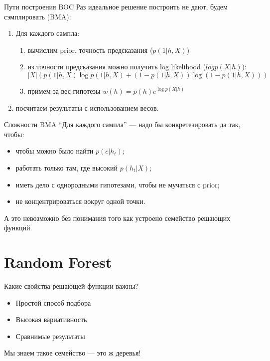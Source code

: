\documentclass[14pt, fleqn, xcolor={dvipsnames, table}]{beamer}
\begin{document}
\begin{frame}{Пути построения BOC}
Раз идеальное решение построить не дают, будем сэмплировать (BMA):
\begin{enumerate}
  \item Для каждого сампла:
  \begin{enumerate}
    \item вычислим prior, точность предсказания ($p(1|h,X)$)
    \item из точности предсказания можно получить log likelihood ($log p(X|h)$):
    {\footnotesize$$
    |X| \left(p(1|h,X) \log p(1|h,X) + \left(1 - p(1|h,X)\right) \log \left(1 - p(1|h,X)\right) \right)
    $$}
    \item примем за вес гипотезы $w(h) = p(h) e^{\log p(X|h)}$
  \end{enumerate}
  \item посчитаем результаты с использованием весов.
\end{enumerate}
\end{frame}

\begin{frame}{Сложности BMA}
 ``Для каждого сампла'' --- надо бы конкретезировать да так, чтобы:
\begin{itemize}
\small
  \item чтобы можно было найти $p(c|h_t)$;
  \item работать только там, где высокий $p(h_t | X)$;
  \item иметь дело с однородными гипотезами, чтобы не мучаться с prior;
  \item не концентрироваться вокруг одной точки.
\end{itemize}
А это невозможно без понимания того как устроено семейство решающих функций.
\end{frame}

\section{Random Forest}

\begin{frame}{Какие свойства решающей функции важны?}
\begin{itemize}
  \item Простой способ подбора
  \item Высокая вариативность
  \item Сравнимые результаты
\end{itemize}
Мы знаем такое семейство --- это ж деревья!
\end{frame}
\end{document}
